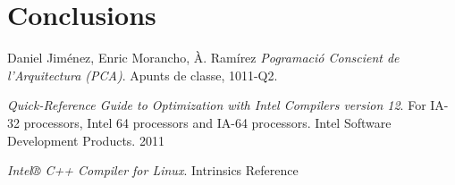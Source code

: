 \documentclass[final,a4paper,11pt,catalan]{report}
\begin{document}


\tableofcontents
\newpage





\chapter{Conclusions}

\begin{thebibliography}{9}

  Daniel Jiménez, Enric Morancho, À. Ramírez
  \emph{Pogramació Conscient de l'Arquitectura (PCA)}.
  Apunts de classe,
  1011-Q2.

  \emph{Quick-Reference Guide to Optimization with Intel Compilers version 12}. For IA-32 processors, Intel 64 processors and IA-64 processors. Intel Software Development Products. 2011

  \emph{Intel® C++ Compiler for Linux}. Intrinsics Reference

\end{thebibliography}
\end{document}
